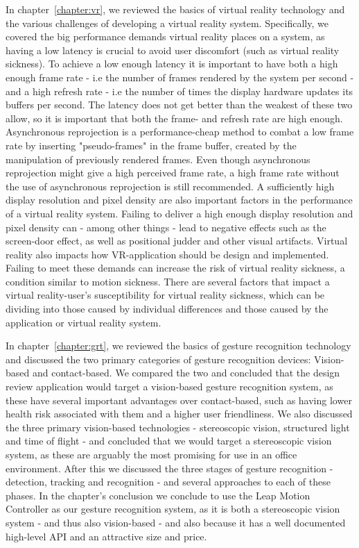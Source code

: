 In chapter~\ref{chapter:vr}, we reviewed the basics of virtual reality technology and the various challenges of developing a virtual reality system. 
Specifically, we covered the big performance demands virtual reality places on a system, as having a low latency is crucial to avoid user discomfort (such
as virtual reality sickness). To achieve a low enough latency it is important to have both a high enough frame rate - i.e the number of frames rendered by the system per second - 
and a high refresh rate - i.e the number of times the display hardware updates its buffers per second. The latency does not get better than the weakest of these two allow, so it is 
important that both the frame- and refresh rate are high enough. Asynchronous reprojection is a performance-cheap method to combat a low frame rate by inserting "pseudo-frames" in 
the frame buffer, created by the manipulation of previously rendered frames. 
Even though asynchronous reprojection might give a high perceived frame rate, a high frame rate without the use of asynchronous reprojection is still 
recommended. A sufficiently high display resolution and pixel density are also important factors in the performance of a virtual reality system. 
Failing to deliver a high enough display resolution and pixel density can - among other things - lead to negative effects such as the screen-door effect, 
as well as positional judder and other visual artifacts. 
Virtual reality also impacts how VR-application should be design and implemented. Failing to meet these demands can increase the 
risk of virtual reality sickness, a condition similar to motion sickness. There are several factors that impact a virtual reality-user's susceptibility for virtual 
reality sickness, which can be dividing into those caused by individual differences and those caused by the application or virtual reality system. 

In chapter~\ref{chapter:grt}, we reviewed the basics of gesture recognition technology and discussed the two primary categories of gesture recognition devices: Vision-based
and contact-based. We compared the two and concluded that the design review application would target a vision-based gesture recognition system, as these have several important
advantages over contact-based, such as having lower health risk associated with them and a higher user friendliness. We also discussed the three primary vision-based 
technologies - stereoscopic vision, structured light and time of flight - and concluded that we would target a stereoscopic vision system, as these are 
arguably the most promising for use in an office environment. After this we discussed the three stages of gesture recognition - detection, tracking and recognition - 
and several approaches to each of these phases. In the chapter's conclusion we conclude to use the Leap Motion Controller as our gesture recognition system, 
as it is both a stereoscopic vision system - and thus also vision-based - and also because it has a well documented high-level API and an attractive size and price.

